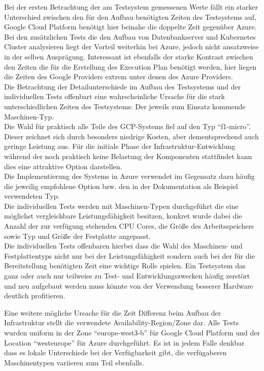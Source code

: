 \begin{spacing}{1.2}
Bei der ersten Betrachtung der am Testsystem gemessenen Werte fällt
ein starker Unterschied zwischen den für den Aufbau benötigten Zeiten
des Testsystems auf, Google Cloud Platform benötigt hier beinahe die
doppelte Zeit gegenüber Azure. Bei den zusätzlichen Tests die den
Aufbau von Datenbankserver und Kubernetes Cluster analysieren liegt
der Vorteil weiterhin bei Azure, jedoch nicht ansatzweise in der selben
Ausprägung. Interessant ist ebenfalls der starke Kontrast zwischen den
Zeiten die für die Erstellung des Execution Plan benötigt werden,
hier liegen die Zeiten des Google Providers extrem unter denen des
Azure Providers.\\
Die Betrachtung der Detailunterschiede im Aufbau des Testsystems und der
individuellen Tests offenbart eine wahrscheinliche Ursache für die
stark unterschiedlichen Zeiten des Testsystems: Der jeweils zum
Einsatz kommende Maschinen-Typ.\\
Die Wahl für praktisch alle Teile des
GCP-Systems fiel auf den Typ \enquote{f1-micro}. Dieser zeichnet sich
durch besonders niedrige Kosten, aber dementsprechend auch geringe
Leistung aus. Für die initiale Phase der Infrastruktur-Entwicklung
während der noch praktisch keine Belastung der Komponenten stattfindet
kann dies eine attraktive Option darstellen.\\
Die Implementierung des Systems in Azure verwendet im Gegensatz dazu
häufig die jeweilig empfohlene Option bzw. den in der Dokumentation als
Beispiel verwendeten Typ.\\
Die individuellen Tests werden mit Maschinen-Typen durchgeführt die
eine möglichst vergleichbare Leistungsfähigkeit besitzen, konkret wurde
dabei die Anzahl der zur verfügung stehenden CPU Cores, die Größe des
Arbeitsspeichers sowie Typ und Größe der Festplatte angepasst.\\
Die individuellen Tests offenbaren hierbei dass die Wahl des Maschinen-
und Festplattentyps nicht nur bei der Leistungsfähigkeit sondern auch
bei der für die Bereitstellung benötigten Zeit eine wichtige Rolle
spielen. Ein Testsystem das ganz oder auch nur teilweise zu Test- und
Entwicklungszwecken häufig zerstört und neu aufgebaut werden muss
könnte von der Verwendung besserer Hardware deutlich profitieren.

Eine weitere mögliche Ursache für die Zeit Differenz beim Aufbau
der Infrastruktur stellt die verwendete Availability-Region/Zone dar.
Alle Tests wurden uniform in der Zone \enquote{europe-west3-b} für
Google Cloud Platform und der Location \enquote{westeurope} für Azure
durchgeführt. Es ist in jedem Falle denkbar dass es lokale Unterschiede
bei der Verfügbarkeit gibt, die verfügaberen Maschinentypen variieren
zum Teil ebenfalls.


\end{spacing}
